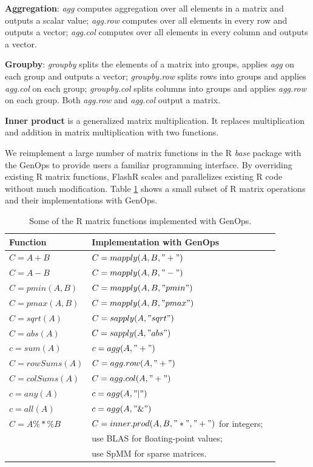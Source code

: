 \noindent \textbf{Aggregation}: \textit{agg} computes aggregation over
all elements in a matrix and outputs a scalar value; \textit{agg.row}
computes over all elements in every row and outputs a vector;
\textit{agg.col} computes over all elements in every column and
outputs a vector.

\noindent \textbf{Groupby}: \textit{groupby} splits the elements of a matrix
into groups, applies \textit{agg} on each group and outputs a vector;
\textit{groupby.row} splits rows into groups and applies \textit{agg.col}
on each group; \textit{groupby.col} splits columns into groups and applies
\textit{agg.row} on each group. Both \textit{agg.row} and \textit{agg.col}
output a matrix.

\noindent \textbf{Inner product} is a generalized matrix multiplication.
It replaces multiplication and addition in matrix multiplication with
two functions.

We reimplement a large number of matrix functions in the R \textit{base}
package with the GenOps to provide users a familiar programming interface.
By overriding existing R matrix functions, FlashR scales and parallelizes
existing R code without much modification. Table \ref{tbl:Rfuns} shows
a small subset of R matrix operations and their implementations
with GenOps.

\begin{table}
\begin{center}
\footnotesize
\begin{tabular}{|l|l|l|}
\hline
Function & Implementation with GenOps \\
\hline
$C=A+B$ & $C=mapply(A, B, "+")$ \\
$C=A-B$ & $C=mapply(A, B, "-")$ \\
$C=pmin(A,B)$ & $C=mapply(A, B, "pmin")$ \\
$C=pmax(A,B)$ & $C=mapply(A, B, "pmax")$ \\
$C=sqrt(A)$ & $C=sapply(A, "sqrt")$ \\
$C=abs(A)$ & $C=sapply(A, "abs")$ \\
\hline
$c=sum(A)$ & $c=agg(A, "+")$ \\
$C=rowSums(A)$ & $C=agg.row(A, "+")$ \\
$C=colSums(A)$ & $C=agg.col(A, "+")$ \\
$c=any(A)$ & $c=agg(A, "|")$ \\
$c=all(A)$ & $c=agg(A, "\&")$ \\
\hline
$C=A \%*\% B$ & $C=inner.prod(A, B, "*", "+")$ for integers; \\
 & use BLAS for floating-point values; \\
 & use SpMM \cite{SEM_SpMM} for sparse matrices. \\
\hline
\end{tabular}
\normalsize
\end{center}
\caption{Some of the R matrix functions implemented with GenOps.}
\label{tbl:Rfuns}
\end{table}

